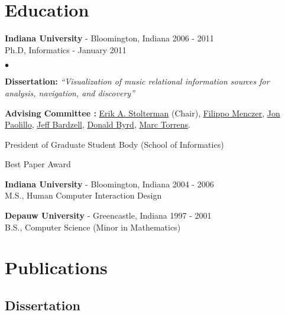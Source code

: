\documentclass[margin,line]{res}
\let\resumesection\section
\newenvironment{list2}{
  \begin{list}{$\bullet$}{%
      \setlength{\itemsep}{0in}
      \setlength{\parsep}{0in} \setlength{\parskip}{0in}
      \setlength{\topsep}{0in} \setlength{\partopsep}{0in} 
      \setlength{\leftmargin}{0.2in}}}{\end{list}}
\begin{document}
\begin{resume}
\section{\sc Education}
{\bf Indiana University} - Bloomington, Indiana \hfill 2006 - 2011\\
Ph.D, Informatics - January 2011
\begin{list2}
\item {\bf \small Dissertation:} {\em``Visualization of music relational information sources for analysis, navigation, and discovery''}
\item {\bf \small Advising Committee :}
  \href{https://luddy.indiana.edu/contact/profile/?Erik_Stolterman~Bergqvist}{Erik A. Stolterman} (Chair),
  \href{https://en.wikipedia.org/wiki/Filippo_Menczer}{Filippo Menczer},
  \href{https://luddy.indiana.edu/contact/profile/?profile_id=269}{Jon Paolillo},
  \href{https://ist.psu.edu/directory/jsb6077a}{Jeff Bardzell},
  \href{https://homes.luddy.indiana.edu/donbyrd/}{Donald Byrd},
  \href{https://marctorrens.net/}{Marc Torrens}.
\item {President of Graduate Student Body (School of Informatics)}
\item {Best Paper Award \cite{zmds}}
\end{list2}

{\bf Indiana University} - Bloomington, Indiana \hfill 2004 - 2006\\
M.S., Human Computer Interaction Design

{\bf Depauw University} - Greencastle, Indiana \hfill 1997 - 2001\\
B.S., Computer Science (Minor in Mathematics)


\vspace{20px}
\section{\sc Publications}
\subsection{\sc Dissertation}

\renewcommand{\section}[2]{}
\renewcommand{\section}{\resumesection}



\end{resume}
\end{document}
